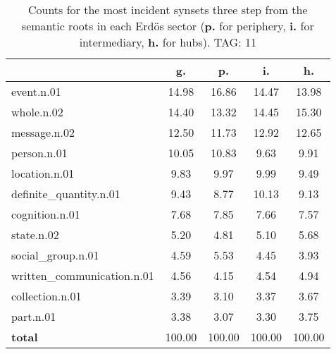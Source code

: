\begin{table}[h!]
\begin{center}
\begin{tabular}{| l | c | c | c | c |}\hline
 & g. & p. & i. & h. \\\hline
event.n.01 & 14.98  & 16.86  & 14.47  & 13.98 \\\hline
whole.n.02 & 14.40  & 13.32  & 14.45  & 15.30 \\\hline
message.n.02 & 12.50  & 11.73  & 12.92  & 12.65 \\\hline
person.n.01 & 10.05  & 10.83  & 9.63  & 9.91 \\\hline
location.n.01 & 9.83  & 9.97  & 9.99  & 9.49 \\\hline
definite\_quantity.n.01 & 9.43  & 8.77  & 10.13  & 9.13 \\\hline
cognition.n.01 & 7.68  & 7.85  & 7.66  & 7.57 \\\hline
state.n.02 & 5.20  & 4.81  & 5.10  & 5.68 \\\hline
social\_group.n.01 & 4.59  & 5.53  & 4.45  & 3.93 \\\hline
written\_communication.n.01 & 4.56  & 4.15  & 4.54  & 4.94 \\\hline
collection.n.01 & 3.39  & 3.10  & 3.37  & 3.67 \\\hline
part.n.01 & 3.38  & 3.07  & 3.30  & 3.75 \\\hline
{{\bf total}} & 100.00  & 100.00  & 100.00  & 100.00 \\\hline
\end{tabular}
\caption{Counts for the most incident synsets three step from the semantic roots in each Erd\"os sector ({\bf p.} for periphery, {\bf i.} for intermediary, {\bf h.} for hubs). TAG: 11}
\end{center}
\end{table}
